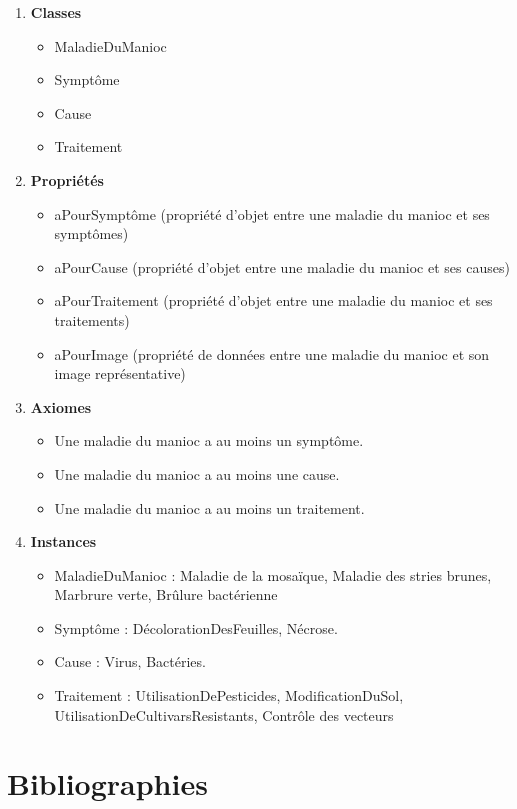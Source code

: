 \documentclass{article}
\begin{document}
	\begin{enumerate}
		\item \textbf{\large{Classes}}
		\begin{itemize}
			\item MaladieDuManioc
			\item Symptôme
			\item Cause
			\item Traitement
		\end{itemize}
		
		\item \textbf{\large{Propriétés}}
		\begin{itemize}
			\item aPourSymptôme (propriété d'objet entre une maladie du manioc et ses symptômes)
			\item aPourCause (propriété d'objet entre une maladie du manioc et ses causes)
			\item aPourTraitement (propriété d'objet entre une maladie du manioc et ses traitements)
			\item aPourImage (propriété de données entre une maladie du manioc et son image représentative)
		\end{itemize}
		
		\item \textbf{\large{Axiomes}}
		\begin{itemize}
			\item Une maladie du manioc a au moins un symptôme.
			\item Une maladie du manioc a au moins une cause.
			\item Une maladie du manioc a au moins un traitement.
		\end{itemize}
		
		\item \textbf{\large{Instances}}
		\begin{itemize}
			\item MaladieDuManioc : Maladie de la mosaïque, Maladie des stries brunes, Marbrure verte, Brûlure bactérienne
			\item Symptôme : DécolorationDesFeuilles, Nécrose.
			\item Cause : Virus, Bactéries.
			\item Traitement : UtilisationDePesticides, ModificationDuSol, UtilisationDeCultivarsResistants, Contrôle des vecteurs
		\end{itemize}

	\end{enumerate}

	\newpage
	\section{Bibliographies}
	
	
\end{document}
